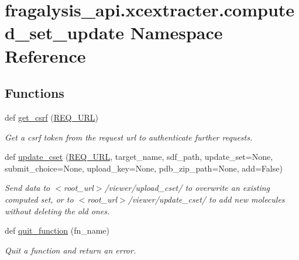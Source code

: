 \hypertarget{namespacefragalysis__api_1_1xcextracter_1_1computed__set__update}{}\section{fragalysis\+\_\+api.\+xcextracter.\+computed\+\_\+set\+\_\+update Namespace Reference}
\label{namespacefragalysis__api_1_1xcextracter_1_1computed__set__update}
\subsection*{Functions}
\begin{DoxyCompactItemize}
\item 
def \hyperlink{namespacefragalysis__api_1_1xcextracter_1_1computed__set__update_a5737d189121121fcfc89d399bf38e877}{get\+\_\+csrf} (\hyperlink{namespacefragalysis__api_1_1xcextracter_1_1computed__set__update_adefba58b79837d4e7133a92963544f3f}{R\+E\+Q\+\_\+\+U\+RL})
\begin{DoxyCompactList}\small\item\em Get a csrf token from the request url to authenticate further requests. \end{DoxyCompactList}\item 
def \hyperlink{namespacefragalysis__api_1_1xcextracter_1_1computed__set__update_a3fd757f4575c325be0c0288fa1f0738d}{update\+\_\+cset} (\hyperlink{namespacefragalysis__api_1_1xcextracter_1_1computed__set__update_adefba58b79837d4e7133a92963544f3f}{R\+E\+Q\+\_\+\+U\+RL}, target\+\_\+name, sdf\+\_\+path, update\+\_\+set=\textquotesingle{}None\textquotesingle{}, submit\+\_\+choice=None, upload\+\_\+key=None, pdb\+\_\+zip\+\_\+path=None, add=False)
\begin{DoxyCompactList}\small\item\em Send data to $<$root\+\_\+url$>$/viewer/upload\+\_\+cset/ to overwrite an existing computed set, or to $<$root\+\_\+url$>$/viewer/update\+\_\+cset/ to add new molecules without deleting the old ones. \end{DoxyCompactList}\item 
def \hyperlink{namespacefragalysis__api_1_1xcextracter_1_1computed__set__update_a9a7a1666e3c737a48bc3ebfe981adeef}{quit\+\_\+function} (fn\+\_\+name)
\begin{DoxyCompactList}\small\item\em Quit a function and return an error. \end{DoxyCompactList}\item 

\end{DoxyCompactItemize}
